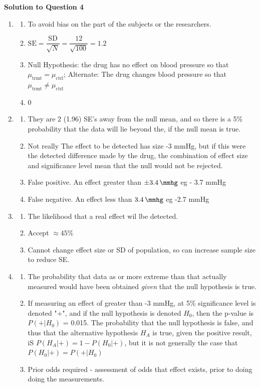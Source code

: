 \documentclass[a4paper,12pt,fleqn]{article}
\begin{document}
\textbf{Solution to Question 4}\newline
\begin{enumerate}[label=\alph*)]
\item
\begin{enumerate}[label=\roman*)]
	\item To avoid bias on the part of the subjects or the researchers.
	\item $\text{SE}=\dfrac{\text{SD}}{\sqrt{N}}=\dfrac{12}{\sqrt{100}}=1.2$
	\item Null Hypothesis: the drug has no effect on blood pressure so that $\mu_\text{trmt}=\mu_\text{ctrl}$; Alternate: The drug changes blood pressure so that $\mu_\text{trmt}\neq\mu_\text{ctrl}$
	\item 0
\end{enumerate}
\item 
\begin{enumerate}[label=\roman*)]
\item They are 2 (1.96) SE's away from the null mean, and so there is a 5\% probability that the data will lie beyond the, if the null mean is true.
\item Not really The effect to be detected has size -3 mmHg, but if this were the detected difference made by the drug, the combination of effect size and significance level mean that the null would not be rejected.
\item False positive. An effect greater than $ \pm\SI{3.4}{\mmhg}$ eg - 3.7 mmHg
\item False negative.  An effect less than $ \SI{3.4}{\mmhg}$ eg -2.7 mmHg
\end{enumerate}
\item
\begin{enumerate}[label=\roman*)]
\item The likelihood that a real effect wil lbe detected.
\item Accept $\approx 45$\%
\item Cannot change effect size or SD of population, so can increase sample size to reduce SE.
\end{enumerate}
\item
\begin{enumerate}[label=\roman*)]
\item The probability that data as or more extreme than that actually measured would have been obtained \emph{given} that the null hypothesis is true.
\item If measuring an effect of greater than -3 mmHg, at 5\% significance level is denoted "+", and if the null hypothesis is denoted $H_0$, then the p-value is $P(+|H_0)$ = 0.015. The probability that the null hypothesis is false, and thus that the alternative hypothesis $H_A$ is true, given the positive result, iS $P(H_A|+)=1-P(H_0|+)$, but it is not generally the case that $P(H_0|+)=P(+|H_0)$
\item Prior odds required - assessment of odds that effect exists, prior to doing doing the measurements.
\end{enumerate}
\end{enumerate}



\end{document}
